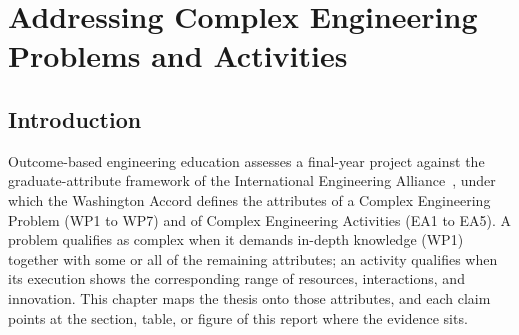 \chapter{Addressing Complex Engineering Problems and Activities}

\section{Introduction}
Outcome-based engineering education assesses a final-year project against the
graduate-attribute framework of the International Engineering
Alliance~\cite{iea2021gapc}, under which the Washington Accord defines the
attributes of a Complex Engineering Problem (WP1 to WP7) and of Complex
Engineering Activities (EA1 to EA5). A problem qualifies as complex when it
demands in-depth knowledge (WP1) together with some or all of the remaining
attributes; an activity qualifies when its execution shows the corresponding
range of resources, interactions, and innovation. This chapter maps the
thesis onto those attributes, and each claim points at the section, table,
or figure of this report where the evidence sits.

